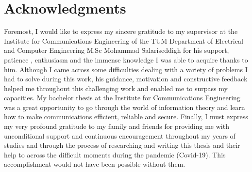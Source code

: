 \chapter*{Acknowledgments}
Foremost, I would like to express my sincere gratitude to my supervisor at the Institute for Communications Engineering of the TUM Department of Electrical and Computer Engineering M.Sc Mohammad Salariseddigh for his support, patience , enthusiasm and the immense knowledge I was able to acquire thanks to him. Although I came across some difficulties dealing with a variety of problems I had to solve during this work, his guidance, motivation and constructive feedback  helped me throughout this challenging work and enabled me to surpass my capacities.
My bachelor thesis at the Institute for Communications Engineering was a great opportunity to go through the world of information theory and learn how to make communications efficient, reliable and secure.
Finally, I must express my very profound gratitude to my family and friends for providing me with unconditional support and continuous encouragement throughout my years of studies and through the process of researching and writing this thesis and their help to across the difficult moments during the pandemic (Covid-19). This accomplishment would not have been possible without them.


